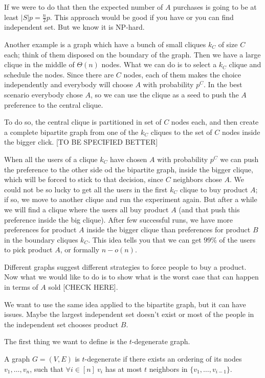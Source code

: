  If we were to do that then the expected number of $A$ purchases is going to be at least $|S|p = \frac{n}{2}p$. This approach would be good if you have or you can find independent set. But we know it is NP-hard. 
 
 Another example is a graph which have a bunch of small cliques $k_C$ of size $C$ each; think of them disposed on the boundary of the graph. Then we have a large clique in the middle of $\Theta(n)$ nodes. What we can do is to select a $k_C$ clique and schedule the nodes. Since there are $C$ nodes, each of them makes the choice independently and everybody will choose $A$ with probability $p^C$. In the best scenario everybody chose $A$, so we can use the clique as a seed to push the $A$ preference to the central clique.
 
 To do so, the central clique is partitioned in set of $C$ nodes each, and then create a complete bipartite graph from one of the $k_C$ cliques to the set of $C$ nodes inside the bigger click. [TO BE SPECIFIED BETTER]
 
 When all the users of a clique $k_C$ have chosen $A$ with probability $p^C$ we can push the preference to the other side od the bipartite graph, inside the bigger clique, which will be forced to stick to that decision, since $C$ neighbors chose $A$. We could not be so lucky to get all the users in the first $k_C$ clique to buy product $A$; if so, we move to another clique and run the experiment again. But after a while we will find a clique where the users all buy product $A$ (and that push this preference inside the big clique). After few successful runs, we have more preferences for product $A$ inside the bigger clique than preferences for product $B$ in the boundary cliques $k_C$. This idea tells you that we can get $99\%$ of the users to pick product $A$, or formally $n - o(n)$.
 
Different graphs suggest different strategies to force people to buy a product. Now what we would like to do is to show what is the worst case that can happen in terms of $A$ sold [CHECK HERE].
 
 We want to use the same idea applied to the bipartite graph, but it can have issues. Maybe the largest independent set doesn't exist or most of the people in the independent set chooses product $B$. 
 
 The first thing we want to define is the $t$-degenerate graph.
 
 \begin{defn}
 	A graph $G=(V, E)$ is $t$-degenerate if there exists an ordering of its nodes $v_1, \ldots, v_n$,  such that $\forall i \in [n]\ v_i$ has at most $t$ neighbors in $\{v_1, \ldots, v_{i-1}\}$.
 \end{defn}

